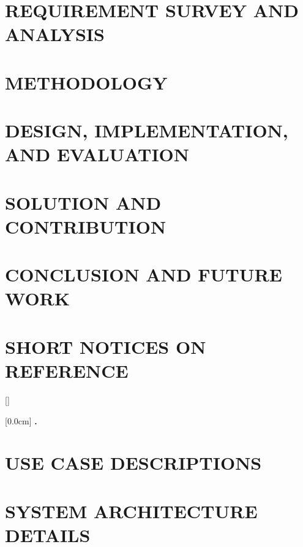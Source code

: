 \documentclass[a4paper,13pt,3p,twoside]{report}
\renewcommand{\bibname}{reference}
\renewcommand{\figurename}{Figure}
\renewcommand{\tablename}{Table}
\renewcommand{\chaptername}{CHAPTER}
\theoremstyle{definition}
\begin{document}
\newpage
\chapter{REQUIREMENT SURVEY AND ANALYSIS}
\label{chapter:Related_works}


\newpage
\chapter{METHODOLOGY}
\label{chapter:Methodology}


\newpage
\chapter{DESIGN, IMPLEMENTATION, AND EVALUATION}
\label{chapter:Experiment}


\newpage
\chapter{SOLUTION AND CONTRIBUTION}
\label{chapter:SolutionAndContribution}


\newpage
\chapter{CONCLUSION AND FUTURE WORK}
\label{chapter:conclusion}


\newpage
\chapter*{SHORT NOTICES ON REFERENCE}
\label{chapter:reference}


\newpage
\renewcommand\bibname{REFERENCE}
\printbibliography
{}

\appendixpage
\appendices
\addappheadtotoc
\renewcommand{\figurename}{Figure}
\renewcommand{\tablename}{Table}
\renewcommand{\chaptername}{CHAPTER}

[]
\titlespacing*{\chapter}{0pt}{-20pt}{20pt}

    [0.0cm]
    {\bfseries\vspace{0.3cm}}
    {{\bfseries{\scshape} \thecontentslabel.\ }}
    {}
    {\contentspage}

\chapter{USE CASE DESCRIPTIONS}


\chapter{SYSTEM ARCHITECTURE DETAILS}

\end{document}
